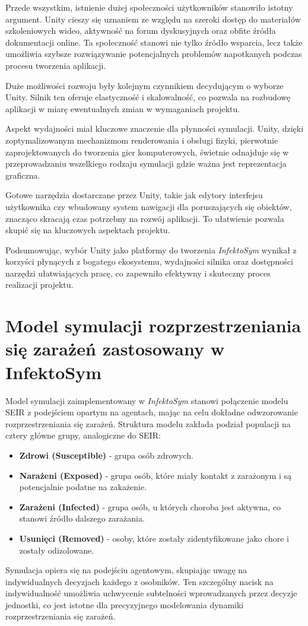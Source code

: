 Przede wszystkim, istnienie dużej społeczności użytkowników stanowiło istotny argument. Unity cieszy się uznaniem ze względu na szeroki dostęp do materiałów szkoleniowych wideo, aktywność na forum dyskusyjnych oraz obfite źródła dokumentacji online. Ta społeczność stanowi nie tylko źródło wsparcia, lecz także umożliwia szybsze rozwiązywanie potencjalnych problemów napotkanych podczas procesu tworzenia aplikacji.

Duże możliwości rozwoju były kolejnym czynnikiem decydującym o wyborze Unity. Silnik ten oferuje elastyczność i skalowalność, co pozwala na rozbudowę aplikacji w miarę ewentualnych zmian w wymaganiach projektu.

Aspekt wydajności miał kluczowe znaczenie dla płynności symulacji. Unity, dzięki zoptymalizowanym mechanizmom renderowania i obsługi fizyki, pierwotnie zaprojektowanych do tworzenia gier komputerowych, świetnie odnajduje się w przeprowadzaniu wszelkiego rodzaju symulacji gdzie ważna jest reprezentacja graficzna.

Gotowe narzędzia dostarczane przez Unity, takie jak edytory interfejsu użytkownika czy wbudowany system nawigacji dla poruszających się obiektów, znacząco skracają czas potrzebny na rozwój aplikacji. To ułatwienie pozwala skupić się na kluczowych aspektach projektu.

Podsumowując, wybór Unity jako platformy do tworzenia \textit{InfektoSym} wynikał z korzyści płynących z bogatego ekosystemu, wydajności silnika oraz dostępności narzędzi ułatwiających pracę, co zapewniło efektywny i skuteczny proces realizacji projektu.
\section{\textbf{Model symulacji rozprzestrzeniania się zarażeń zastosowany w InfektoSym}}

Model symulacji zaimplementowany w \textit{InfektoSym} stanowi połączenie modelu SEIR z podejściem opartym na agentach, mając na celu dokładne odwzorowanie rozprzestrzeniania się zarażeń. Struktura modelu zakłada podział populacji na cztery główne grupy, analogiczne do SEIR:
\begin{itemize}
	\item \textbf{Zdrowi (Susceptible)}  - grupa osób zdrowych.
	\item \textbf{Narażeni (Exposed)} - grupa osób, które miały kontakt z zarażonym i są potencjalnie podatne na zakażenie.
	\item \textbf{Zarażeni (Infected)} - grupa osób, u których choroba jest aktywna, co stanowi źródło dalszego zarażania.
	\item \textbf{Usunięci (Removed)} - osoby, które zostały zidentyfikowane jako chore i zostały odizolowane.
\end{itemize}
Symulacja opiera się na podejściu agentowym, skupiając uwagę na indywidualnych decyzjach każdego z osobników. Ten szczególny nacisk na indywidualność umożliwia uchwycenie subtelności wprowadzanych przez decyzje jednostki, co jest istotne dla precyzyjnego modelowania dynamiki rozprzestrzeniania się zarażeń.

